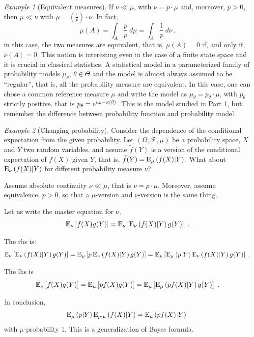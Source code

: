 \documentclass[12pt,a4paper]{amsart}
\theoremstyle{plain}%
\theoremstyle{definition}
\theoremstyle{remark}
\newtheorem{example}{Example}
\begin{document}
\begin{example}[Equivalent measures] If $\nu \ll \mu$, with $\nu = p
    \cdot \mu$ and, moreover, $p > 0$, then $\mu \ll \nu$ with $\mu =
    \left(\frac1p\right) \cdot \nu$. In fact,
    \begin{equation*}
      \mu(A) = \int_A \frac p p \ d\mu = \int_A \frac1p \ d\nu \ .
    \end{equation*}
in this case, the two measures are equivalent, that is, $\mu(A) = 0$
if, and only if, $\nu(A) = 0$. This notion is interesting even in the
case of a finite state space and it is crucial in classical
statistics. A statistical model in a parameterized family of
probability models $\mu_\theta$, $\theta \in \Theta$ and the model is
almost always assumed to be ``regular'', that is, all the probability
measure are equivalent. In this case, one can chose a common reference
measure $\mu$ and write the model as $\mu_\theta = p_\theta \cdot
\mu$, with $p_\theta$ strictly positive, that is $p_\theta =
\mathrm{e}^{u_\theta - \kappa(\theta)}$. This is the model studied in Part
1, but remember the difference between probability function and
probability model.  
\end{example}

\begin{example}[Changing probability]
  Consider the dependence of the conditional expectation from the
  given probability. Let $(\Omega,\mathcal F, \mu)$ be a probability
  space, $X$ and $Y$ two random variables, and assume
  $\widetilde f(Y)$ is a version of the conditional expectation of
  $f(X)$ given $Y$, that is,
  $\widetilde f(Y) = \operatorname{E}_{\mu}\left(f(X) \middle| Y\right)$. What about
  $\operatorname{E}_{\nu}\left(f(X) \middle| Y\right)$ for different probability measure $\nu$?

Assume absolute continuity $\nu \ll \mu$, that is $\nu = p \cdot
\mu$. Moreover, assume equivalence, $p > 0$, so that a $\mu$-version and
$\nu$-version is the same thing.

Let us write the master equation for $\nu$,
\begin{equation*}
  \operatorname{\mathbb E}_{\nu}\left[f(X) g(Y)\right] = \operatorname{\mathbb E}_{\nu}\left[\operatorname{E}_{\nu}\left(f(X) \middle| Y\right)
    g(Y)\right] \ .
\end{equation*}

The rhs is:
\begin{equation*}
\operatorname{\mathbb E}_{\nu}\left[\operatorname{E}_{\nu}\left(f(X) \middle| Y\right) g(Y)\right] = \operatorname{\mathbb E}_{\mu}\left[p \operatorname{E}_{\nu}\left(f(X) \middle| Y\right) g(Y)\right] = \operatorname{\mathbb E}_{\mu}\left[\operatorname{E}_{\mu}\left(p \middle| Y\right) \operatorname{E}_{\nu}\left(f(X) \middle| Y\right) g(Y)\right]\ .
\end{equation*}

The lhs is
\begin{equation*}
  \operatorname{\mathbb E}_{\nu}\left[{f(X)} g(Y)\right] = \operatorname{\mathbb E}_{\mu}\left[p {f(X)} g(Y)\right] = \operatorname{\mathbb E}_{\mu}\left[\operatorname{E}_{\mu}\left(p{f(X)} \middle| Y\right) g(Y)\right] \ .
\end{equation*}

In conclusion,
\begin{equation*}
  \operatorname{E}_{\mu}\left(p \middle| Y\right) \operatorname{E}_{p \cdot\mu}\left(f(X) \middle| Y\right) = \operatorname{E}_{\mu}\left(p{f(X)} \middle| Y\right) \   
\end{equation*}
with $\mu$-probability 1. This is a generalization of Bayes formula. 

\end{example}
\end{document}
